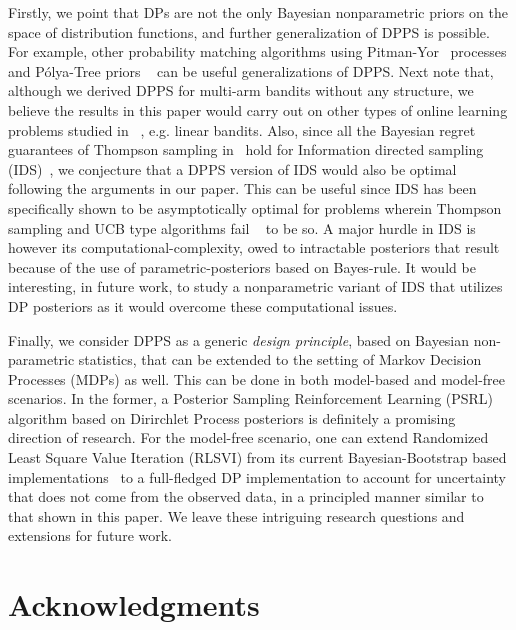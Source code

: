 \documentclass[10pt]{article}
\begin{document}
Firstly, we point that DPs are not the only Bayesian nonparametric priors on the space of distribution functions,   and further generalization of DPPS is possible.  For example, other probability matching algorithms using Pitman-Yor~\citep{pitman2006bessel} processes and P{\'o}lya-Tree priors ~\citep{castillo2017polya,castillo2024bayesian} can be useful generalizations of DPPS. Next note that, although we derived DPPS for multi-arm bandits without any structure, we believe the results in this paper would carry out on other types of online learning problems studied in ~\citep{russo2016information}, e.g. linear bandits. Also, since all the Bayesian regret guarantees of Thompson sampling in~\citep{russo2016information} hold for Information directed sampling (IDS)~\citep{russo2014learning}, we conjecture that a DPPS version of IDS would also be optimal following the arguments in our paper. This can be useful since IDS has been specifically shown to be asymptotically optimal for problems wherein Thompson sampling and UCB type algorithms fail ~\citep{lattimore2017end} to be so. A major hurdle in IDS is however its computational-complexity, owed to intractable posteriors that result because of the use of parametric-posteriors based on Bayes-rule. It would be interesting, in future work, to study a nonparametric variant of IDS that utilizes DP posteriors as it would overcome these computational issues.

Finally, we consider DPPS as a generic \textit{design principle}, based on Bayesian non-parametric statistics, that can be extended to the setting of Markov Decision Processes (MDPs) as well. This can be done in both model-based and model-free scenarios. In the former, a Posterior Sampling Reinforcement Learning (PSRL)~\citep{osband2013more,fan2021model} algorithm based on Dirirchlet Process posteriors is definitely a promising direction of research. For the model-free scenario, one can extend Randomized Least Square Value Iteration (RLSVI) from its current Bayesian-Bootstrap based implementations~\citep{osband2016deep,osband2019deep} to a full-fledged DP implementation to account for uncertainty that does not come from the observed data, in a principled manner similar to that shown in this paper.
We leave these intriguing research questions and extensions for future work.


\section*{Acknowledgments}
\end{document}

